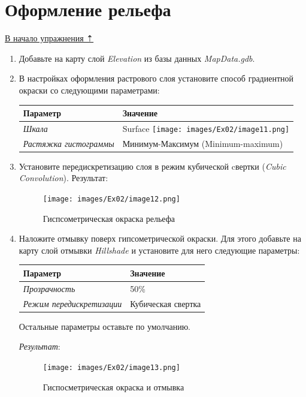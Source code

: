 \documentclass[12pt,]{book}
\begin{document}
\hypertarget{map-design-general-relief}{%
\section{Оформление рельефа}\label{map-design-general-relief}}

\protect\hyperlink{map-design-general}{В начало упражнения ⇡}

\begin{enumerate}
\def\labelenumi{\arabic{enumi}.}
\item
  Добавьте на карту слой \emph{Elevation} из базы данных \emph{MapData.gdb}.
\item
  В настройках оформления растрового слоя установите способ градиентной окраски со следующими параметрами:

  \begin{longtable}[]{@{}ll@{}}
  \toprule
  Параметр & Значение\tabularnewline
  \midrule
  \endhead
  \emph{Шкала} & Surface \texttt{[image: images/Ex02/image11.png]}\tabularnewline
  \emph{Растяжка гистограммы} & Минимум-Максимум (Minimum-maximum)\tabularnewline
  \bottomrule
  \end{longtable}
\item
  Установите передискретизацию слоя в режим кубической cвертки (\emph{Cubic Convolution}). Результат:

  \begin{figure}
  \centering
  \texttt{[image: images/Ex02/image12.png]}
  \caption{Гиспсометрическая окраска рельефа}
  \end{figure}
\item
  Наложите отмывку поверх гипсометрической окраски. Для этого добавьте на карту слой отмывки \emph{Hillshade} и установите для него следующие параметры:

  \begin{longtable}[]{@{}ll@{}}
  \toprule
  Параметр & Значение\tabularnewline
  \midrule
  \endhead
  \emph{Прозрачность} & 50\%\tabularnewline
  \emph{Режим передискретизации} & Кубическая свертка\tabularnewline
  \bottomrule
  \end{longtable}

  Остальные параметры оставьте по умолчанию.

  \emph{Результат}:

  \begin{figure}
  \centering
  \texttt{[image: images/Ex02/image13.png]}
  \caption{Гиспосметрическая окраска и отмывка}
  \end{figure}
\end{enumerate}
\end{document}
